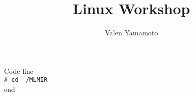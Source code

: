 \documentclass{article}
\title{Linux Workshop}
\author{Valen Yamamoto}
\newcommand{\shellcmd}[1]{\\\indent\indent\texttt{\footnotesize\# #1}\\}
\begin{document}
\maketitle

Code line
\shellcmd{cd ~/MLMIR}
end
\end{document}
